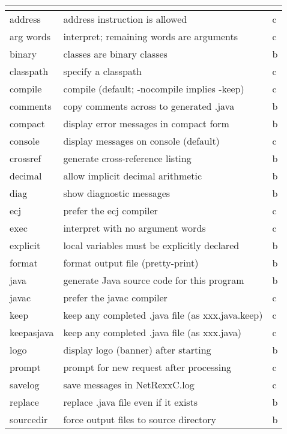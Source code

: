 \begin{longtable}[l]{|l|p{10cm}|l|}
\endlastfoot
\rowcolor[gray]{0.8} \bfseries \huge   & \normalsize  &  \\
\hline
address & address instruction is allowed & c \\
\hline
arg words & interpret; remaining words are arguments & c \\
\hline
binary &  classes are binary classes & b \\
\hline
 classpath  & specify a classpath & c \\
\hline
 compile  & compile (default; -nocompile implies -keep) & c \\
\hline
 comments     & copy comments across to generated .java &b \\
\hline
 compact      & display error messages in compact form &b \\
\hline
 console   & display messages on console (default) &c \\
\hline
 crossref     & generate cross-reference listing &b \\
\hline
 decimal      & allow implicit decimal arithmetic &b \\
\hline
 diag         & show diagnostic messages &b \\
\hline
 ecj        & prefer the ecj compiler &c \\
\hline
 exec        & interpret with no argument words &c \\
\hline
explicit     & local variables must be explicitly declared &b \\
\hline
format       & format output file (pretty-print) &b \\
\hline
 java         & generate Java source code for this program &b \\
\hline
 javac         & prefer the javac compiler &c \\
\hline
 keep         & keep any completed .java file (as xxx.java.keep) &c \\
\hline
keepasjava   & keep any completed .java file (as xxx.java) &c \\
\hline
 logo         & display logo (banner) after starting &b \\
\hline
prompt       & prompt for new request after processing &c \\
\hline
 savelog      & save messages in NetRexxC.log &c \\
\hline
 replace      & replace .java file even if it exists &b \\
\hline
 sourcedir    & force output files to source directory &b \\
\hline

\end{longtable}
